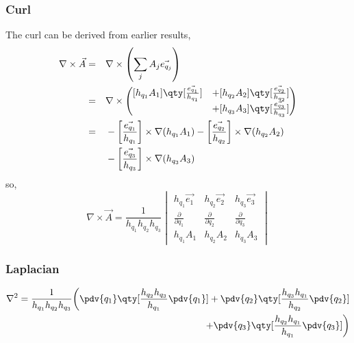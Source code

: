 \subsubsection{Curl}
\label{sec:curlcurvi}
The curl can be derived from earlier results,
\begin{align*}
  \nabla \times \vec{A} &=&& \nabla \times \left( \sum_j A_j \vec{e_{q_j}} \right) \\
  &=&& \nabla \times \left(
    \begin{matrix}
      [h_{q_1}A_1] \qty[\frac{\vec{e_{q_1}}}{h_{q_1}} ] &+
      [h_{q_2}A_2] \qty[ \frac{\vec{e_{q_2}}}{h_{q_2}} ] \\ &+
      [h_{q_3}A_3] \qty[ \frac{\vec{e_{q_3}}}{h_{q_3}} ]
    \end{matrix}
  \right) \\
  &= && - \left[ \frac{\vec{e_{q_1}}}{h_{q_1}} \right] \times \nabla
  (h_{q_1}A_1)
  - \left[ \frac{\vec{e_{q_2}}}{h_{q_2}} \right] \times \nabla (h_{q_2}A_2) \\
  &&& - \left[ \frac{\vec{e_{q_3}}}{h_{q_3}} \right] \times \nabla
  (h_{q_3}A_3)
\end{align*}
so,
\begin{equation}
  \label{eq:curlincurvi}
  \nabla \times \vec{A} = 
  \frac{1}{h_{q_1}h_{q_2}h_{q_3}}
  \begin{vmatrix}
    h_{q_1} \vec{e_1}              & h_{q_2} \vec{e_2}              & h_{q_3} \vec{e_{3}}             \\
    \frac{\partial}{\partial q_1} & \frac{\partial}{\partial q_2} & \frac{\partial}{\partial q_3} \\
    h_{q_1} A_1 & h_{q_2} A_2 & h_{q_3} A_3
  \end{vmatrix}
\end{equation}

\subsubsection{Laplacian}
\label{sec:laplaciancurvi}

\begin{equation}
  \label{eq:laplacianincurvi}
  \begin{split}
    \nabla^2 = \frac{1}{h_{q_1}h_{q_2}h_{q_3}} 
    \bigg( \pdv{q_1} \qty[ \frac{h_{q_2}h_{q_3}}{h_{q_1}} \pdv{q_1} ] 
    +  \pdv{q_2} \qty[ \frac{h_{q_3}h_{q_1}}{h_{q_2}} \pdv{q_2} ] \\
    +  \pdv{q_3} \qty[ \frac{h_{q_2}h_{q_1}}{h_{q_1}} \pdv{q_3} ] \bigg) 
  \end{split}
\end{equation}
